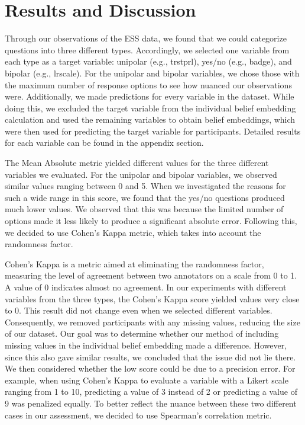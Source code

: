\section*{Results and Discussion}

Through our observations of the ESS data, we found that we could categorize questions into three different types. Accordingly, we selected one variable from each type as a target variable: unipolar (e.g., trstprl), yes/no (e.g., badge), and bipolar (e.g., lrscale). For the unipolar and bipolar variables, we chose those with the maximum number of response options to see how nuanced our observations were. Additionally, we made predictions for every variable in the dataset. While doing this, we excluded the target variable from the individual belief embedding calculation and used the remaining variables to obtain belief embeddings, which were then used for predicting the target variable for participants. Detailed results for each variable can be found in the appendix section.

The Mean Absolute metric yielded different values for the three different variables we evaluated. For the unipolar and bipolar variables, we observed similar values ranging between 0 and 5. When we investigated the reasons for such a wide range in this score, we found that the yes/no questions produced much lower values. We observed that this was because the limited number of options made it less likely to produce a significant absolute error. Following this, we decided to use Cohen's Kappa metric, which takes into account the randomness factor.

Cohen's Kappa is a metric aimed at eliminating the randomness factor, measuring the level of agreement between two annotators on a scale from 0 to 1. A value of 0 indicates almost no agreement. In our experiments with different variables from the three types, the Cohen's Kappa score yielded values very close to 0. This result did not change even when we selected different variables. Consequently, we removed participants with any missing values, reducing the size of our dataset. Our goal was to determine whether our method of including missing values in the individual belief embedding made a difference. However, since this also gave similar results, we concluded that the issue did not lie there. We then considered whether the low score could be due to a precision error. For example, when using Cohen's Kappa to evaluate a variable with a Likert scale ranging from 1 to 10, predicting a value of 3 instead of 2 or predicting a value of 9 was penalized equally. To better reflect the nuance between these two different cases in our assessment, we decided to use Spearman's correlation metric.

